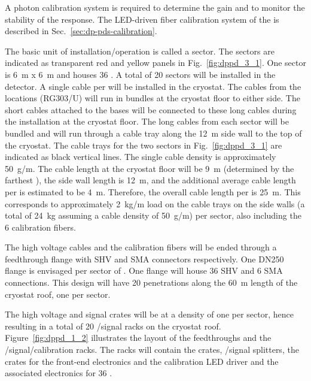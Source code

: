 A photon calibration system is required to determine the  gain and to monitor the stability of the  response. The LED-driven fiber calibration system of the  is described in Sec.~\ref{sec:dp-pds-calibration}. 

The basic unit of installation/operation is called a sector. The sectors are indicated as transparent red and yellow panels in Fig.~\ref{fig:dppd_3_1}. One \dual {} sector is \SI{6}{\m} x \SI{6}{\m} and houses \num{36} . A total of \num{20} sectors will be installed in the detector. A single  cable per  will be installed in the cryostat. The cables from the  locations (RG303/U) will run in bundles at the cryostat floor to either side. The short cables attached to the  bases will be connected to these long cables during the  installation at the cryostat floor. The long cables from each sector will be bundled and will run through a cable tray along the \SI{12}{\m} side wall to the top of the cryostat. The cable trays for the two sectors in Fig.~\ref{fig:dppd_3_1} are indicated as black vertical lines. The single cable density is approximately \SI{50}{\g/\m}. The cable length at the cryostat floor will be \SI{9}{\m} (determined by the farthest ), the side wall length is \SI{12}{\m}, and the additional average cable length per  is estimated to be \SI{4}{\m}. Therefore, the overall cable length per  is \SI{25}{\m}. This corresponds to approximately \SI{2}{\kg/\m} load on the cable trays on the side walls (a total of \SI{24}{\kg} assuming a cable density of \SI{50}{\g/\m}) per sector, also including the \num{6} calibration fibers. 

The high voltage cables and the calibration fibers will be ended through a feedthrough flange with SHV and SMA connectors respectively. One DN250 flange is envisaged per sector of \dual {}. One flange will house \num{36} SHV and \num{6} SMA connections. This \dual {} design will have \num{20} penetrations along the \SI{60}{\m} length of the cryostat roof, one per sector.

The high voltage and signal crates will be at a density of one per sector, hence resulting in a total of \num{20} /signal racks on the cryostat roof. Figure~\ref{fig:dppd_1_2} illustrates the layout of the feedthroughs and the /signal/calibration racks. The racks will contain the  crates, /signal splitters, the  crates for the front-end electronics and the calibration LED driver and the associated electronics for \num{36} .

